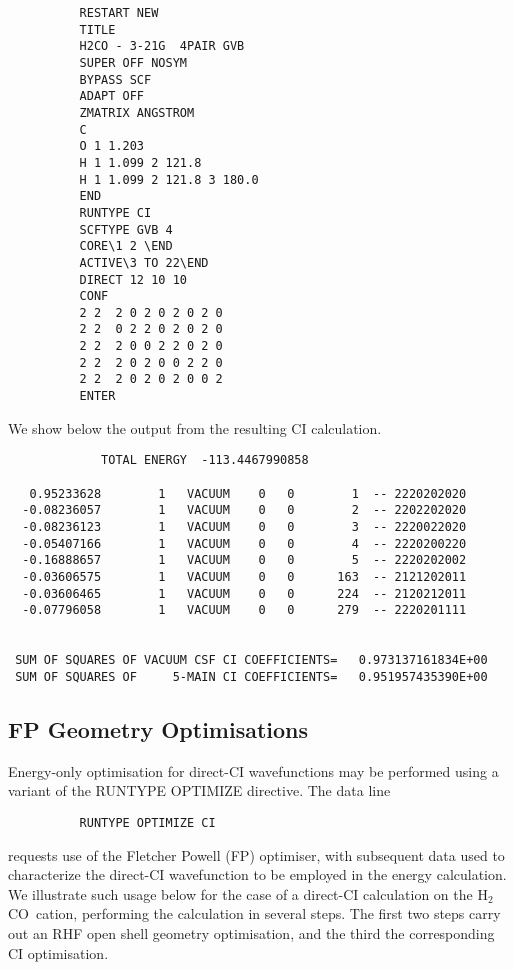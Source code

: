 \documentclass[11pt,fleqn]{article}
\newcommand{\formaldehyde}{\mbox{H$_{2}$CO}}
\begin{document}
{
\footnotesize
\begin{verbatim}
          RESTART NEW
          TITLE
          H2CO - 3-21G  4PAIR GVB
          SUPER OFF NOSYM
          BYPASS SCF
          ADAPT OFF
          ZMATRIX ANGSTROM
          C
          O 1 1.203
          H 1 1.099 2 121.8
          H 1 1.099 2 121.8 3 180.0
          END
          RUNTYPE CI
          SCFTYPE GVB 4
          CORE\1 2 \END
          ACTIVE\3 TO 22\END
          DIRECT 12 10 10
          CONF
          2 2  2 0 2 0 2 0 2 0
          2 2  0 2 2 0 2 0 2 0
          2 2  2 0 0 2 2 0 2 0
          2 2  2 0 2 0 0 2 2 0
          2 2  2 0 2 0 2 0 0 2
          ENTER
\end{verbatim}
}
We show below the output from the resulting CI calculation.
{
\footnotesize
\begin{verbatim}
             TOTAL ENERGY  -113.4467990858

   0.95233628        1   VACUUM    0   0        1  -- 2220202020
  -0.08236057        1   VACUUM    0   0        2  -- 2202202020
  -0.08236123        1   VACUUM    0   0        3  -- 2220022020
  -0.05407166        1   VACUUM    0   0        4  -- 2220200220
  -0.16888657        1   VACUUM    0   0        5  -- 2220202002
  -0.03606575        1   VACUUM    0   0      163  -- 2121202011
  -0.03606465        1   VACUUM    0   0      224  -- 2120212011
  -0.07796058        1   VACUUM    0   0      279  -- 2220201111
 
 
 SUM OF SQUARES OF VACUUM CSF CI COEFFICIENTS=   0.973137161834E+00
 SUM OF SQUARES OF     5-MAIN CI COEFFICIENTS=   0.951957435390E+00
\end{verbatim}
}


\subsection[FP Geometry Optimisations]{FP Geometry Optimisations}

Energy-only optimisation for direct-CI wavefunctions may be performed 
using a variant of the RUNTYPE OPTIMIZE directive. The data line

{
\footnotesize
\begin{verbatim}
          RUNTYPE OPTIMIZE CI
\end{verbatim}
}
requests use of the Fletcher Powell (FP) optimiser, with subsequent
data used to characterize the direct-CI wavefunction to be
employed in the energy calculation.  We illustrate such usage below
for the case of a direct-CI calculation on the \formaldehyde\
cation, performing the calculation in several steps.
The first two steps carry out an RHF open shell geometry
optimisation, and the third the corresponding CI optimisation.\\
\end{document}
